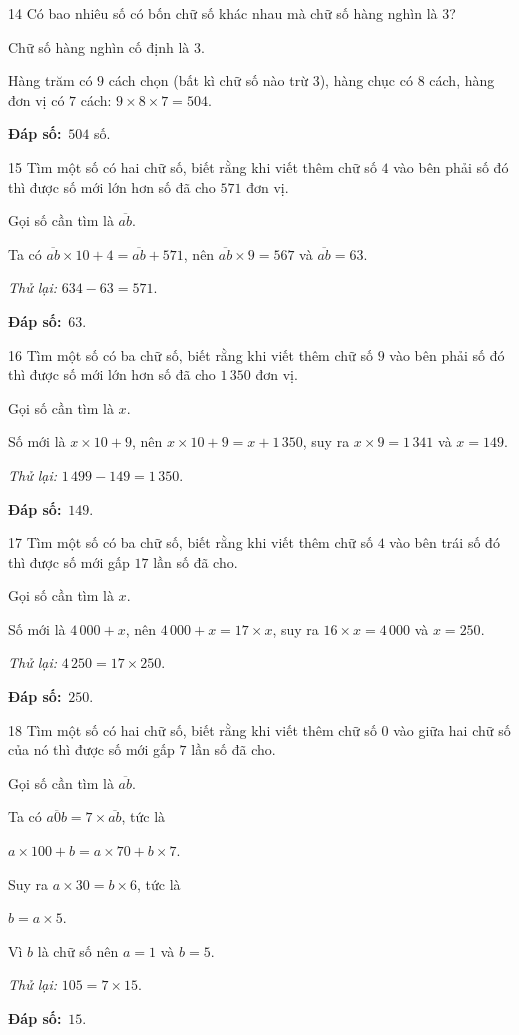 \documentclass[11pt]{article}
\newif\ifsol \solfalse
\providecommand{\AnsWord}{Đáp số}
\newcommand{\dapso}[1]{\par\textbf{\AnsWord:}\ #1}
\newcommand{\probsol}[1]{%
  \begin{lrbox}{\solmeasure}\begin{minipage}{\dimexpr\linewidth-24pt\relax}#1\end{minipage}\end{lrbox}%
  \ifsol
    \begin{solbox}#1\end{solbox}%
  \else
    \setlength{\solht}{\dimexpr\ht\solmeasure+\dp\solmeasure+0.85cm\relax}%
    \ifdim\solht<1.35cm\setlength{\solht}{1.35cm}\fi
    \begin{tcolorbox}[colback=white,colframe=Line,boxrule=0.8pt,arc=5pt,
      left=8pt,right=8pt,top=4pt,bottom=4pt,height=\solht]{\footnotesize\color{Slate}\itshape\WorkWord}\end{tcolorbox}%
  \fi}
\newcommand{\nd}[1]{\overline{#1}}
\newcommand{\gap}{\vspace{0.3cm}}
\def\WorkWord{Bài làm:}
\def\AnsWord{Đáp số}
\begin{document}
\gap
\begin{probbox}{14}{\relax}
Có bao nhiêu số có bốn chữ số khác nhau mà chữ số hàng nghìn là $3$?
\end{probbox}
\probsol{
Chữ số hàng nghìn cố định là $3$.\par Hàng trăm có $9$ cách chọn (bất kì chữ số nào trừ $3$), hàng chục có $8$ cách, hàng đơn vị có $7$ cách: $9\times8\times7=504$.
\dapso{$504$ số.}}
\gap
\begin{probbox}{15}{\relax}
Tìm một số có hai chữ số, biết rằng khi viết thêm chữ số $4$ vào bên phải số đó thì được số mới lớn hơn số đã cho $571$ đơn vị.
\end{probbox}
\probsol{
Gọi số cần tìm là $\nd{ab}$.\par Ta có $\nd{ab}\times10+4=\nd{ab}+571$, nên $\nd{ab}\times9=567$ và $\nd{ab}=63$.\par
\emph{Thử lại:} $634-63=571$.
\dapso{$63$.}}
\gap
\begin{probbox}{16}{\relax}
Tìm một số có ba chữ số, biết rằng khi viết thêm chữ số $9$ vào bên phải số đó thì được số mới lớn hơn số đã cho $1\,350$ đơn vị.
\end{probbox}
\probsol{
Gọi số cần tìm là $x$.\par Số mới là $x\times10+9$, nên $x\times10+9=x+1\,350$, suy ra $x\times9=1\,341$ và $x=149$.\par
\emph{Thử lại:} $1\,499-149=1\,350$.
\dapso{$149$.}}
\gap
\begin{probbox}{17}{\relax}
Tìm một số có ba chữ số, biết rằng khi viết thêm chữ số $4$ vào bên trái số đó thì được số mới gấp $17$ lần số đã cho.
\end{probbox}
\probsol{
Gọi số cần tìm là $x$.\par Số mới là $4\,000+x$, nên $4\,000+x=17\times x$, suy ra $16\times x=4\,000$ và $x=250$.\par
\emph{Thử lại:} $4\,250=17\times250$.
\dapso{$250$.}}
\gap
\begin{probbox}{18}{\relax}
Tìm một số có hai chữ số, biết rằng khi viết thêm chữ số $0$ vào giữa hai chữ số của nó thì được số mới gấp $7$ lần số đã cho.
\end{probbox}
\probsol{
Gọi số cần tìm là $\nd{ab}$.\par Ta có $\nd{a0b}=7\times\nd{ab}$, tức là\par $a\times100+b=a\times70+b\times7$.\par
Suy ra $a\times30=b\times6$, tức là\par $b=a\times5$.\par Vì $b$ là chữ số nên $a=1$ và $b=5$.\par
\emph{Thử lại:} $105=7\times15$.
\dapso{$15$.}}
\end{document}
